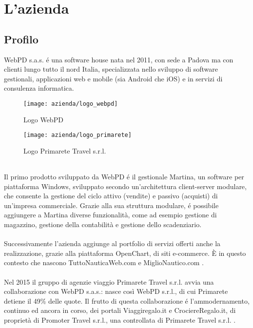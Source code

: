 
\chapter{L'azienda}
\label{cap:processi-metodologie}

\section{Profilo}
WebPD s.a.s. é una software house nata nel 2011, con sede a Padova ma con clienti lungo tutto il nord Italia, specializzata nello sviluppo di software gestionali, applicazioni web e mobile (sia Android che iOS) e in servizi di consulenza informatica.\\
\begin{figure}[!h] 
	\centering 
	\texttt{[image: azienda/logo\_webpd]} 
	\caption{Logo WebPD}
\end{figure}
\begin{figure}[!h] 
	\centering 
	\texttt{[image: azienda/logo\_primarete]} 
	\caption{Logo Primarete Travel s.r.l.}
\end{figure}
\\
Il primo prodotto sviluppato da WebPD é il gestionale Martina, un software per piattaforma Windows, sviluppato secondo un'architettura client-server modulare, che consente la gestione del ciclo attivo (vendite) e passivo (acquisti) di un'impresa commerciale. Grazie alla sua struttura modulare, é possibile aggiungere a Martina diverse funzionalità, come ad esempio gestione di magazzino, gestione della contabilità e gestione dello scadenziario.\\\\
Successivamente l'azienda aggiunge al portfolio di servizi offerti anche la realizzazione, grazie alla piattaforma OpenChart, di siti e-commerce. È in questo contesto che nascono TuttoNauticaWeb.com e MiglioNautico.com .\\\\
Nel 2015 il gruppo di agenzie viaggio Primarete Travel s.r.l. avvia una collaborazione con WebPD s.a.s.: nasce così WebPD s.r.l., di cui Primarete detiene il 49\% delle quote. Il frutto di questa collaborazione é l'ammodernamento, continuo ed ancora in corso, dei portali Viaggiregalo.it e  CrociereRegalo.it, di proprietà di Promoter Travel s.r.l., una controllata di Primarete Travel s.r.l. .\\\\
